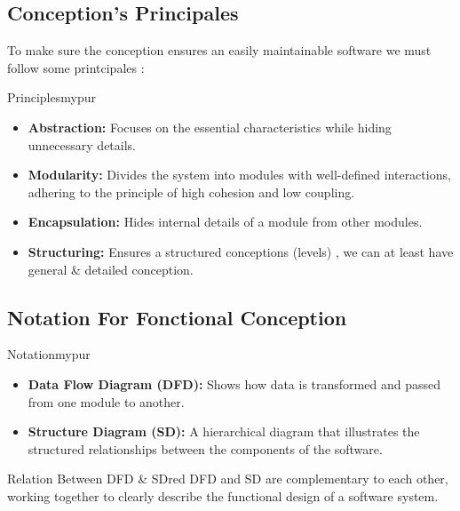 \vspace{1cm}

\subsection{Conception's Principales}To make sure the conception ensures an easily maintainable
software we must follow some printcipales :


\begin{prettyBox}{Principles}{mypur}

\begin{itemize}
    \item \textbf{Abstraction:} Focuses on the essential characteristics while
hiding unnecessary details.
    \item \textbf{Modularity:} Divides the system into modules with well-defined interactions,
adhering to the principle of high cohesion and low coupling.
    \item \textbf{Encapsulation:} Hides internal details of a module from other modules.
    \item \textbf{Structuring:} Ensures a structured conceptions (levels) , we can at least have general \& detailed conception.
\end{itemize}

\end{prettyBox}

\vspace{0.5cm}

\subsection{Notation For Fonctional Conception}


\begin{prettyBox}{Notation}{mypur}
\begin{itemize}
    \item \textbf{Data Flow Diagram (DFD):} Shows how data is transformed and passed from one module to another.
    \item \textbf{Structure Diagram (SD):} A hierarchical diagram that illustrates the structured relationships between the components of the software.
\end{itemize}
\end{prettyBox}


\vspace{0.5cm}

\begin{prettyBox}{Relation Between DFD \& SD}{red}
    DFD and SD are complementary to each other, working together to clearly describe the functional design of a software system.
\end{prettyBox}

